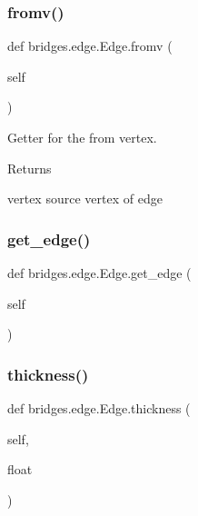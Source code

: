 \subsubsection{\texorpdfstring{fromv()}{fromv()}}
{\footnotesize\ttfamily def bridges.\+edge.\+Edge.\+fromv (\begin{DoxyParamCaption}\item[{}]{self }\end{DoxyParamCaption})}



Getter for the from vertex. 

\begin{DoxyReturn}{Returns}


vertex source vertex of edge 
\end{DoxyReturn}
\mbox{\label{classbridges_1_1edge_1_1_edge_a406b906ea8e177a6e54f6c794c04df3d}} 
\subsubsection{\texorpdfstring{get\+\_\+edge()}{get\_edge()}}
{\footnotesize\ttfamily def bridges.\+edge.\+Edge.\+get\+\_\+edge (\begin{DoxyParamCaption}\item[{}]{self }\end{DoxyParamCaption})}

\mbox{\label{classbridges_1_1edge_1_1_edge_a1155b5f604410cd46a81902bb8aa348b}} 
\subsubsection{\texorpdfstring{thickness()}{thickness()}\hspace{0.1cm}{\footnotesize\ttfamily [1/2]}}
{\footnotesize\ttfamily def bridges.\+edge.\+Edge.\+thickness (\begin{DoxyParamCaption}\item[{}]{self,  }\item[{}]{float }\end{DoxyParamCaption})}



